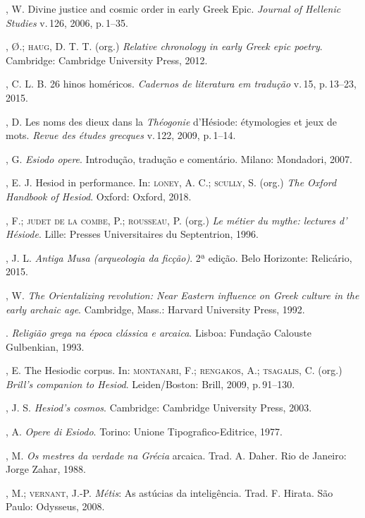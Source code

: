 \begin{bibliohedra}
, W. Divine justice and cosmic order in early Greek Epic.
\textit{Journal of Hellenic Studies} v.\,126, 2006, p.\,1--35.

, Ø.; \textsc{haug}, D. T. T. (org.) \textit{Relative chronology in early
Greek epic poetry}. Cambridge: Cambridge University Press, 2012.

, C. L. B. 26 hinos homéricos. \textit{Cadernos de literatura em
tradução} v.\,15, p.\,13--23, 2015.

, D. Les noms des dieux dans la \textit{Théogonie} d'Hésiode:
étymologies et jeux de mots. \textit{Revue des études grecques} v.\,122,
2009, p.\,1--14.

, G. \textit{Esiodo opere}. Introdução, tradução e comentário.
Milano: Mondadori, 2007.

, E. J. Hesiod in performance. In: \textsc{loney}, A. C.; \textsc{scully}, S. (org.)
\textit{The Oxford Handbook of Hesiod}. Oxford: Oxford, 2018.

, F.; \textsc{judet de la combe}, P.; \textsc{rousseau}, P. (org.) \textit{Le métier
du mythe: lectures d' Hésiode}. Lille: Presses Universitaires du
Septentrion, 1996.

, J. L. \textit{Antiga Musa (arqueologia da ficção)}. 2ª edição.
Belo Horizonte: Relicário, 2015.

, W. \textit{The Orientalizing revolution: Near Eastern influence
on Greek culture in the early archaic age}. Cambridge, Mass.: Harvard
University Press, 1992.

\titidem. \textit{Religião grega na época clássica e arcaica}. Lisboa: Fundação
Calouste Gulbenkian, 1993.

, E. The Hesiodic corpus. In: \textsc{montanari}, F.; \textsc{rengakos}, A.;
\textsc{tsagalis}, C. (org.) \textit{Brill's companion to Hesiod}. Leiden/Boston:
Brill, 2009, p.\,91--130.

, J. S. \textit{Hesiod's cosmos}. Cambridge: Cambridge University
Press, 2003.

, A. \textit{Opere di Esiodo}. Torino: Unione Tipografico-Editrice,
1977.

, M. \textit{Os mestres da verdade na Grécia} arcaica. Trad. A.
Daher. Rio de Janeiro: Jorge Zahar, 1988.

, M.; \textsc{vernant}, J.-P. \textit{Métis}: As astúcias da inteligência.
Trad. F. Hirata. São Paulo: Odysseus, 2008.


\end{bibliohedra}
